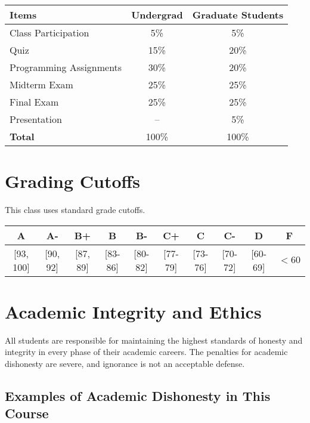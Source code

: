 \documentclass[11pt,letterpaper]{article}
\begin{document}
\begin{table}[h]
\centering
\begin{tabular}{lcc}
\toprule
\textbf{Items} & \textbf{Undergrad} & \textbf{Graduate Students} \\
\midrule
Class Participation & 5\% & 5\% \\
Quiz & 15\% & 20\% \\
Programming Assignments & 30\% & 20\% \\
Midterm Exam & 25\% & 25\% \\
Final Exam & 25\% & 25\% \\
Presentation & -- & 5\% \\
\midrule
\textbf{Total} & 100\% & 100\% \\
\bottomrule
\end{tabular}
\end{table}

\section*{Grading Cutoffs}

This class uses standard grade cutoffs.

\begin{table}[h]
\centering
\begin{tabular}{|c|c|c|c|c|c|c|c|c|c|}
\hline
\textbf{A} & \textbf{A-} & \textbf{B+} & \textbf{B} & \textbf{B-} & \textbf{C+} & \textbf{C} & \textbf{C-} & \textbf{D} & \textbf{F} \\
\hline
{[}93, 100{]} & {[}90, 92{]} & {[}87, 89{]} & {[}83-86{]} & {[}80-82{]} & {[}77-79{]} & {[}73-76{]} & {[}70-72{]} & {[}60-69{]} & $< 60$ \\
\hline
\end{tabular}
\end{table}

\section*{Academic Integrity and Ethics}

All students are responsible for maintaining the highest standards of honesty and integrity in every phase of their academic careers. The penalties for academic dishonesty are severe, and ignorance is not an acceptable defense.

\subsection*{Examples of Academic Dishonesty in This Course}
\end{document}
